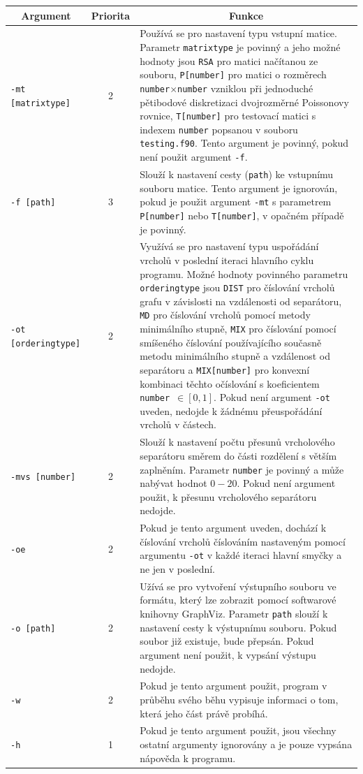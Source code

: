 \documentclass[11pt,american,czech,oneside]{book}
\theoremstyle{plain}
\theoremstyle{definition}
\begin{document}
\bigskip
{\noindent
\footnotesize
  \centering
  \renewcommand{\arraystretch}{1.15}
\begin{tabular}{|l|c|p{10cm}|}
  \hline
  \multicolumn{1}{|c|}{Argument}    & \multicolumn{1}{c|}{Priorita} & \multicolumn{1}{c|}{Funkce} \\
  \hline
  \texttt{-mt [matrixtype]}  & 2 & Používá se pro nastavení typu vstupní matice. Parametr \texttt{matrixtype} je povinný a jeho možné hodnoty jsou \texttt{RSA} pro matici načítanou ze souboru, \texttt{P[number]} pro matici o rozměrech \texttt{number}$\times$\texttt{number} vzniklou při jednoduché pětibodové diskretizaci dvojrozměrné Poissonovy rovnice, \texttt{T[number]} pro testovací matici s indexem \texttt{number} popsanou v souboru \texttt{testing.f90}. Tento argument je povinný, pokud není použit argument \texttt{-f}. \\
  \texttt{-f [path]}& 3 & Slouží k nastavení cesty (\texttt{path}) ke vstupnímu souboru matice. Tento argument je ignorován, pokud je použit argument \texttt{-mt} s parametrem \texttt{P[number]} nebo \texttt{T[number]}, v opačném případě je povinný.\\
  \texttt{-ot [orderingtype]}& 2 & Využívá se pro nastavení typu uspořádání vrcholů v poslední iteraci hlavního cyklu programu. Možné hodnoty povinného parametru \texttt{orderingtype} jsou \texttt{DIST} pro číslování vrcholů grafu v závislosti na vzdálenosti od separátoru, \texttt{MD} pro číslování vrcholů pomocí metody minimálního stupně, \texttt{MIX} pro číslování pomocí smíšeného číslování používajícího současně metodu minimálního stupně a vzdálenost od separátoru a \texttt{MIX[number]} pro konvexní kombinaci těchto očíslování s koeficientem \texttt{number}~$ \in [0,1]$. Pokud není argument \texttt{-ot} uveden, nedojde k žádnému přeuspořádání vrcholů v částech. \\
  \texttt{-mvs [number]}& 2 & Slouží k nastavení počtu přesunů vrcholového separátoru směrem do části rozdělení s větším zaplněním. Parametr \texttt{number} je povinný a může nabývat hodnot $0 - 20$. Pokud není argument použit, k přesunu vrcholového separátoru nedojde. \\
  \texttt{-oe}& 2 & Pokud je tento argument uveden, dochází k číslování vrcholů číslováním nastaveným pomocí argumentu \texttt{-ot} v každé iteraci hlavní smyčky a ne jen v poslední.\\
  \texttt{-o [path]}& 2 & Užívá se pro vytvoření výstupního souboru ve formátu, který lze zobrazit pomocí softwarové knihovny GraphViz. Parametr \texttt{path} slouží k nastavení cesty k výstupnímu souboru. Pokud soubor již existuje, bude přepsán. Pokud argument není použit, k vypsání výstupu nedojde.\\
  \texttt{-w}& 2 & Pokud je tento argument použit, program v průběhu svého běhu vypisuje informaci o tom, která jeho část právě probíhá. \\
  \texttt{-h}& 1 & Pokud je tento argument použit, jsou všechny ostatní argumenty ignorovány a je pouze vypsána nápověda k programu. \\
  \hline
\end{tabular}
}
\end{document}
